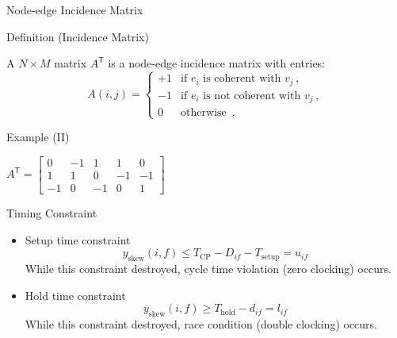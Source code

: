 \documentclass[10pt,ignorenonframetext,mathserif,onlymath]{beamer}
\providecommand{\tightlist}{%
  \setlength{\itemsep}{0pt}\setlength{\parskip}{0pt}}
\begin{document}
\begin{frame}{Node-edge Incidence Matrix}
\protect\hypertarget{node-edge-incidence-matrix}{}

\begin{block}{Definition (Incidence Matrix)}

A \(N \times M\) matrix \(A^\mathsf{T}\) is a node-edge incidence matrix
with entries: \[A(i,j) =  \begin{cases}  
  +1 & \text{if $e_i$ is coherent with $v_j$} \,, \\  
  -1 & \text{if $e_i$ is not coherent with $v_j$} \,, \\  
   0 & \text{otherwise } \,.
  \end{cases}\]

\end{block}

\begin{block}{Example (II)}

\(A^\mathsf{T} = \begin{bmatrix} 0 & -1 & 1 & 1 & 0 \\ 1 & 1 & 0 & -1 & -1 \\ -1 & 0 & -1 & 0 & 1 \end{bmatrix}\)

\end{block}

\end{frame}

\begin{frame}{Timing Constraint}
\protect\hypertarget{timing-constraint}{}

\begin{itemize}
\tightlist
\item
  Setup time constraint
  \[y_\text{skew}(i,f) \le T_\text{CP} - D_{if} - T_\text{setup} = u_{if}\]
  While this constraint destroyed, cycle time violation (zero clocking)
  occurs.
\item
  Hold time constraint
  \[y_\text{skew}(i,f) \ge T_\text{hold} - d_{if} = l_{if}\] While this
  constraint destroyed, race condition (double clocking) occurs.
\end{itemize}

\end{frame}
\end{document}
